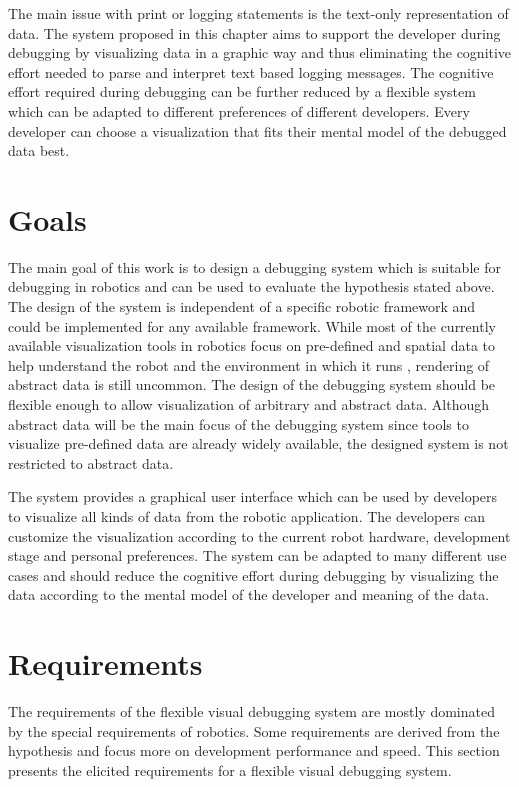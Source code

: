 The main issue with print or logging statements is the text-only representation of data. The system proposed in this chapter aims to support the developer during debugging by visualizing data in a graphic way and thus eliminating the cognitive effort needed to parse and interpret text based logging messages. The cognitive effort required during debugging can be further reduced by a flexible system which can be adapted to different preferences of different developers. Every developer can choose a visualization that fits their mental model of the debugged data best.


\section{Goals}
The main goal of this work is to design a debugging system which is suitable for debugging in robotics and can be used to evaluate the hypothesis stated above. The design of the system is independent of a specific robotic framework and could be implemented for any available framework.
While most of the currently available visualization tools in robotics focus on pre-defined and spatial data to help understand the robot and the environment in which it runs \cite{Collett2010, Quigley2009}, rendering of abstract data is still uncommon. The design of the debugging system should be flexible enough to allow visualization of arbitrary and abstract data. Although abstract data will be the main focus of the debugging system since tools to visualize pre-defined data are already widely available, the designed system is not restricted to abstract data.

The system provides a graphical user interface which can be used by developers to visualize all kinds of data from the robotic application. The developers can customize the visualization according to the current robot hardware, development stage and personal preferences. The system can be adapted to many different use cases and should reduce the cognitive effort during debugging by visualizing the data according to the mental model of the developer and meaning of the data.

\section{Requirements}
The requirements of the flexible visual debugging system are mostly dominated by the special requirements of robotics. Some requirements are derived from the hypothesis and focus more on development performance and speed. This section presents the elicited requirements for a flexible visual debugging system.

